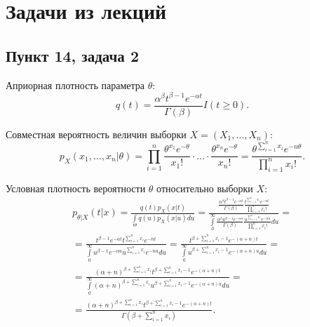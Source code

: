 \chapter{Задачи из лекций}

\section*{Пункт 14, задача 2}

Априорная плотность параметра $\theta$:
\begin{equation}
    q(t) = \frac{\alpha^\beta t^{\beta-1} e^{-\alpha t}}{\Gamma(\beta)} I(t \ge 0).
\end{equation}

Совместная вероятность величин выборки $X = \left ( X_1, \dots, X_n \right )$:
\begin{equation}
    p_X(x_1, \dots, x_n | \theta)
    = \prod_{i=1}^n \frac{\theta^{x_1} e^{-\theta}}{x_1!} \cdot ... \cdot \frac{\theta^{x_n} e^{-\theta}}{x_n!}
    = \frac{\theta^{\sum_{i=1}^n x_i} e^{-n \theta}}{\prod_{i=1}^n x_i!} .
\end{equation}

Условная плотность вероятности $\theta$ относительно выборки $X$:
\begin{multline}
    p_{\theta|X} (t | x)
    = \frac{q(t) p_X(x|t)}{\int \limits_\Theta q(u) p_X(x|u) du}
    =
    \frac{
        \frac{\alpha^\beta t^{\beta-1} e^{-\alpha t}}{\Gamma(\beta)} \frac{t^{\sum_{i=1}^n x_i} e^{-n t}}{\prod_{i=1}^n x_i!}
    }
    {
        \int \limits_0^\infty \frac{\alpha^\beta u^{\beta-1} e^{-\alpha u}}{\Gamma(\beta)} \frac{u^{\sum_{i=1}^n x_i} e^{-n u}}{\prod_{i=1}^n x_i!} du
    } = \\
    = \frac{t^{\beta-1} e^{-\alpha t} t^{\sum_{i=1}^n x_i} e^{-n t}}{\int \limits_0^\infty u^{\beta-1} e^{-\alpha u} u^{\sum_{i=1}^n x_i} e^{-n u} du}
    = \frac{t^{\beta + \sum_{i=1}^n x_i - 1} e^{-(\alpha + n) t}}{\int \limits_0^\infty u^{\beta + \sum_{i=1}^n x_i - 1} e^{- ( \alpha + n ) u} du} = \\
    = \frac{(\alpha + n)^{\beta + \sum_{i=1}^n x_i} t^{\beta + \sum_{i=1}^n x_i - 1} e^{-(\alpha + n) t}}{\int \limits_0^\infty (\alpha + n)^{\beta + \sum_{i=1}^n x_i}  u^{\beta + \sum_{i=1}^n x_i - 1} e^{- ( \alpha + n ) u} du} = \\
    = \frac{(\alpha + n)^{\beta + \sum_{i=1}^n x_i} t^{\beta + \sum_{i=1}^n x_i - 1} e^{-(\alpha + n) t}}{\Gamma \left ( \beta + \sum_{i=1}^n x_i \right )} .
\end{multline}

